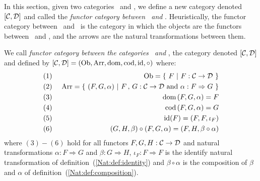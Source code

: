 In this section, given two categories \Cat\ and \Dat, we define a new 
category denoted $[\mbox{$\cal C$},\mbox{$\cal D$}]$ and called the {\em functor category between
\Cat\ and \Dat}. Heuristically, the functor category between \Cat\ and \Dat\
is the category in which the objects are the functors between \Cat\ and \Dat,
and the arrows are the natural transformations between them.
\begin{defin}\label{Nat:def:functor:category}
    We call {\em functor category between the categories \Cat\ and \Dat}, 
    the category denoted $[\mbox{$\cal C$},\mbox{$\cal D$}]$ and  defined by 
    $[\mbox{$\cal C$},\mbox{$\cal D$}]=(\mbox{\rm Ob},\mbox{\rm Arr},\mbox{\rm dom},\mbox{\rm cod},\mbox{\rm id},\circ)$ where:
        \begin{eqnarray*}
            (1)&\ &\ob=\{\ F\ |\ F:\Cat\to\Dat\ \}\\
            (2)&\ &\arr=\{\ (F,G,\alpha)\ |\ F\,,\,G:\Cat\to\Dat\ 
            \mbox{and}\ \alpha:F\Rightarrow G\ \}\\
            (3)&\ &\dom\,(F,G,\alpha)=F\\
            (4)&\ &\cod\,(F,G,\alpha)=G\\
            (5)&\ &\id(F)=(F,F,\iota_{F})\\
            (6)&\ &(G,H,\beta)\circ(F,G,\alpha)=(F,H,\beta\circ\alpha)
        \end{eqnarray*}
    where $(3)-(6)$ hold for all functors $F,G,H:\mbox{$\cal C$}\to\mbox{$\cal D$}$ and natural
    transformations $\alpha:F\Rightarrow G$ and $\beta:G\Rightarrow H$,
    $\iota_{F}:F\Rightarrow F$ is the identify natural transformation 
    of definition~(\ref{Nat:def:identity}) and $\beta\circ\alpha$ is the
    composition of $\beta$ and $\alpha$ of definition~(\ref{Nat:def:composition}).
\end{defin}



